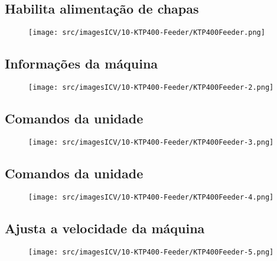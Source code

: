 \thispagestyle{fancy}
\vspace{\fill}
\subsection{\small Habilita alimentação de chapas}
\begin{figure}
    \centering
    \texttt{[image: src/imagesICV/10-KTP400-Feeder/KTP400Feeder.png]}
\end{figure}

\newpage
\thispagestyle{fancy}
\vspace{\fill}
\subsection{\small Informações da máquina}
\begin{figure}
    \centering
    \texttt{[image: src/imagesICV/10-KTP400-Feeder/KTP400Feeder-2.png]}
\end{figure}

\newpage
\thispagestyle{fancy}
\vspace{\fill}
\subsection{\small Comandos da unidade}
\begin{figure}
    \centering
    \texttt{[image: src/imagesICV/10-KTP400-Feeder/KTP400Feeder-3.png]}
\end{figure}

\newpage
\thispagestyle{fancy}
\vspace{\fill}
\subsection{\small Comandos da unidade}
\begin{figure}
    \centering
    \texttt{[image: src/imagesICV/10-KTP400-Feeder/KTP400Feeder-4.png]}
\end{figure}

\newpage
\thispagestyle{fancy}
\vspace{\fill}
\subsection{\small Ajusta a velocidade da máquina}
\begin{figure}
    \centering
    \texttt{[image: src/imagesICV/10-KTP400-Feeder/KTP400Feeder-5.png]}
\end{figure}

